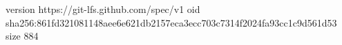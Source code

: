 version https://git-lfs.github.com/spec/v1
oid sha256:861fd321081148aee6e621db2157eca3ecc703c7314f2024fa93cc1c9d561d53
size 884
